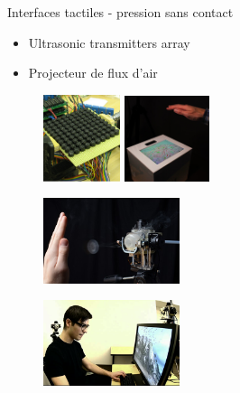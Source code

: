 \begin{frame}{Interfaces tactiles - pression sans contact}
\begin{multicols}{2}

\begin{itemize}
\item Ultrasonic transmitters array
\item Projecteur de flux d'air
\end{itemize}

\begin{figure}
\centering
\includegraphics[width=2.25cm]{images/ultrahaptics}
\includegraphics[width=2.5cm]{images/ultrahaptics_project_photo}
\caption{\cite{Alexander2011}}
\end{figure}


\begin{figure}
\centering
\includegraphics[width=4cm]{images/AIREALVortexRingFig}
\end{figure}
\vspace{-1.5cm}
\begin{figure}
\includegraphics[width=4cm]{images/aireal2}
\caption{\cite{Sodhi2013}}
\end{figure}

\end{multicols}
\end{frame}

